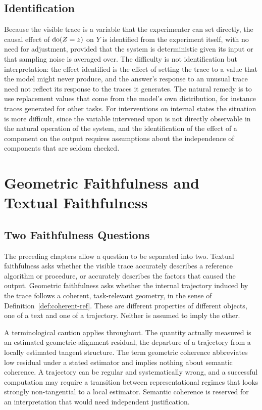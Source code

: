 \section{Identification}

Because the visible trace is a variable that the experimenter can set directly, the causal effect of $\operatorname{do}(Z=z)$ on $Y$ is identified from the experiment itself, with no need for adjustment, provided that the system is deterministic given its input or that sampling noise is averaged over. The difficulty is not identification but interpretation: the effect identified is the effect of setting the trace to a value that the model might never produce, and the answer's response to an unusual trace need not reflect its response to the traces it generates. The natural remedy is to use replacement values that come from the model's own distribution, for instance traces generated for other tasks. For interventions on internal states the situation is more difficult, since the variable intervened upon is not directly observable in the natural operation of the system, and the identification of the effect of a component on the output requires assumptions about the independence of components that are seldom checked.

\chapter{Geometric Faithfulness and Textual Faithfulness}
\label{ch:geomfaith}

\section{Two Faithfulness Questions}

The preceding chapters allow a question to be separated into two. Textual faithfulness asks whether the visible trace accurately describes a reference algorithm or procedure, or accurately describes the factors that caused the output. Geometric faithfulness asks whether the internal trajectory induced by the trace follows a coherent, task-relevant geometry, in the sense of Definition~\ref{def:coherent-ref}. These are different properties of different objects, one of a text and one of a trajectory. Neither is assumed to imply the other.

A terminological caution applies throughout. The quantity actually measured is an estimated geometric-alignment residual, the departure of a trajectory from a locally estimated tangent structure. The term geometric coherence abbreviates low residual under a stated estimator and implies nothing about semantic coherence. A trajectory can be regular and systematically wrong, and a successful computation may require a transition between representational regimes that looks strongly non-tangential to a local estimator. Semantic coherence is reserved for an interpretation that would need independent justification.


